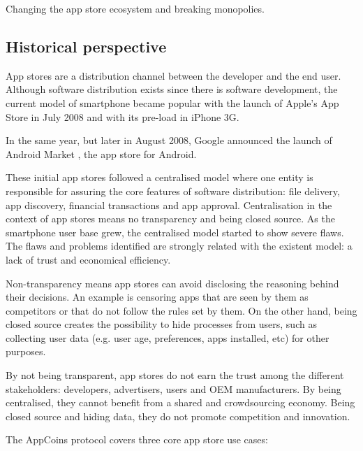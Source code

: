 Changing the app store ecosystem and breaking monopolies.



\medskip

\subsection{Historical perspective}

App stores are a distribution channel between the developer and the end user. Although software distribution exists since there is software development, the current model of smartphone became popular with the launch of Apple's App Store in July 2008 and with its pre-load in iPhone 3G.

In the same year, but later in August 2008, Google announced the launch of Android Market \cite{wiki:market}, the app store for Android.

These initial app stores followed a centralised model where one entity is responsible for assuring the core features of software distribution: file delivery, app discovery, financial transactions and app approval. Centralisation in the context of app stores means no transparency and being closed source. As the smartphone user base grew, the centralised model started to show severe flaws. The flaws and problems identified are strongly related with the existent model: a lack of trust and economical efficiency.

Non-transparency means app stores can avoid disclosing the reasoning behind their decisions. An example is censoring apps that are seen by them as competitors or that do not follow the rules set by them. On the other hand, being closed source creates the possibility to hide processes from users, such as collecting user data (e.g. user age, preferences, apps installed, etc) for other purposes.

By not being transparent, app stores do not earn the trust among the different stakeholders: developers, advertisers, users and OEM manufacturers. By being centralised, they cannot benefit from a shared and crowdsourcing economy. Being closed source and hiding data, they do not promote competition and innovation.

The AppCoins protocol covers three core app store use cases:

